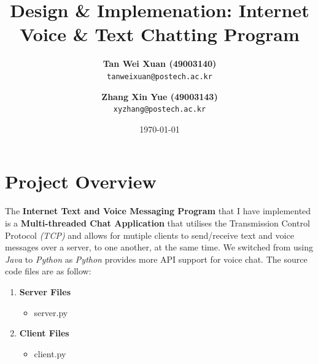 \documentclass[a4paper,11pt]{article}
\begin{document}
\title{\vspace{-1.0cm}\textbf{Design \& Implemenation: \linebreak Internet Voice \& Text Chatting Program}}
\author{
  \textbf{Tan Wei Xuan (49003140)}\\
  \texttt{tanweixuan@postech.ac.kr}
  \and
   \textbf{Zhang Xin Yue (49003143)}\\
  \texttt{xyzhang@postech.ac.kr}
}
\date{\today}
\maketitle

\section{Project Overview}
The\textbf{ Internet Text and Voice Messaging Program} that I have implemented is a \textbf{Multi-threaded Chat Application} that utilises the Transmission Control Protocol \textit{(TCP)} and allows for mutiple clients to send/receive text and voice messages over a server, to one another, at the same time.  We switched from using \textit{Java} to \textit{Python} as \textit{Python} provides more API support for voice chat. The source code files are as follow:
\begin{enumerate}
	\item \textbf{Server Files}
\begin{itemize}
  	\item server.py
\end{itemize}
	\item \textbf{Client Files}
\begin{itemize}
  	\item client.py
\end{itemize}
\end{enumerate}
\end{document}
